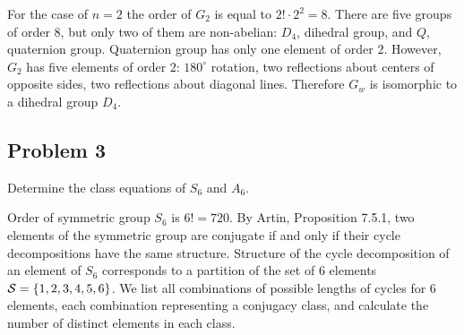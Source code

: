 \documentclass{article}
\theoremstyle{definition}
\DeclarePairedDelimiter\set{\{}{\}}
\begin{document}
For the case of $n=2$ the order of $G_2$ is equal to $2! \cdot 2^2 = 8$.
There are five groups of order $8$, but only two of them are non-abelian: $D_4$, dihedral group, and $Q$, quaternion group.
Quaternion group has only one element of order $2$.
However, $G_2$ has five elements of order $2$: $180^\circ$ rotation, two reflections about centers of opposite sides, two reflections about diagonal lines.
Therefore $G_w$ is isomorphic to a dihedral group $D_4$.


\subsection*{Problem 3}

\begin{tcolorbox}
Determine the class equations of $S_6$ and $A_6$.
\end{tcolorbox}

Order of symmetric group $S_6$ is $6! = 720$.
By Artin, Proposition 7.5.1, two elements of the symmetric group are conjugate if and only if their cycle decompositions have the same structure.
Structure of the cycle decomposition of an element of $S_6$ corresponds to a partition of the set of $6$ elements $\mathcal{S} = \set{1,2,3,4,5,6}$.
We list all combinations of possible lengths of cycles for $6$ elements, each combination representing a conjugacy class, and calculate the number of distinct elements in each class.
\end{document}
